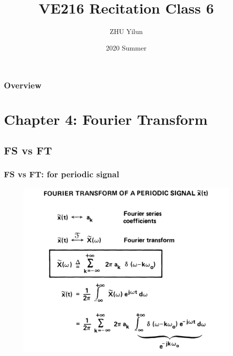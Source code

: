 \documentclass{beamer}
\title[VE216]{VE216 Recitation Class 6} %
\author{ZHU Yilun} %
\institute[SJTU] %
{
UM-SJTU Joint Institute \\ %
\medskip
\textit{VE216 SU20 Teaching Group} %
}
\date{2020 Summer} %
\begin{document}
\begin{frame}
\titlepage %
\end{frame}

\begin{frame}
\frametitle{Overview} %
\tableofcontents %
\end{frame}


\section{Chapter 4: Fourier Transform}

\subsection{FS vs FT}

\begin{frame}
    \frametitle{FS vs FT: for periodic signal}
    \begin{figure}
        \includegraphics[width=0.7\linewidth]{FSvsFT}
    \end{figure}
\end{frame}
\end{document}

